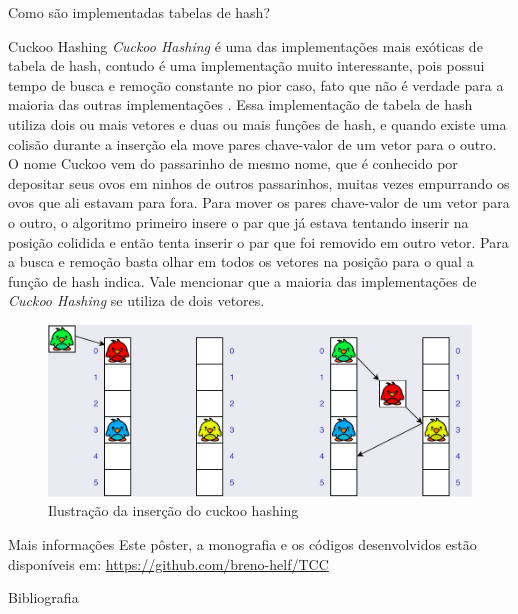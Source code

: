 \documentclass{beamer}
\begin{document}
\begin{frame}
\begin{columns}[t]
\begin{column}{0.5\textwidth}
\begin{block}{Como são implementadas tabelas de hash?}
    
  \end{block}

  \begin{block}{Cuckoo Hashing}
    \textit{Cuckoo Hashing} é uma das implementações mais exóticas de tabela de hash, contudo é uma implementação muito interessante, pois possui tempo de busca e remoção constante no pior caso, fato que não é verdade para a maioria das outras implementações \cite{CuckooHashing}.
    Essa implementação de tabela de hash utiliza dois ou mais vetores e duas ou mais funções de hash, e quando existe uma colisão durante a inserção ela move pares chave-valor de um vetor para o outro. O nome Cuckoo vem do passarinho de mesmo nome, que é conhecido por depositar seus ovos em ninhos de outros passarinhos, muitas vezes empurrando os ovos que ali estavam para fora.
    Para mover os pares chave-valor de um vetor para o outro, o algoritmo primeiro insere o par que já estava tentando inserir na posição colidida e então tenta inserir o par que foi removido em outro vetor. Para a busca e remoção basta olhar em todos os vetores na posição para o qual a função de hash indica. Vale mencionar que a maioria das implementações de \textit{Cuckoo Hashing} se utiliza de dois vetores.
    
    \begin{figure}
      \includegraphics[width=0.75\linewidth]{figuras/cuckooHashingColored.pdf}
      \caption{Ilustração da inserção do cuckoo hashing}
    \end{figure}

    
  \end{block}

  \begin{block}{Mais informações}
    Este pôster, a monografia e os códigos desenvolvidos estão disponíveis em: \url{https://github.com/breno-helf/TCC}
  \end{block}

  \begin{block}{Bibliografia}
    {\scriptsize
    
    
    }
  \end{block}
\end{column}
\end{columns}
\end{frame}
\end{document}

